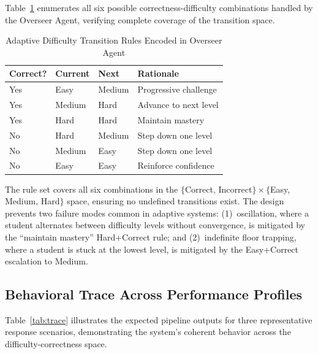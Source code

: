 \documentclass[conference]{IEEEtran}
\begin{document}
Table~\ref{tab:adaptive_rules} enumerates all six possible correctness-difficulty combinations handled by the Overseer Agent, verifying complete coverage of the transition space.

\begin{table}[htbp]
\caption{Adaptive Difficulty Transition Rules Encoded in Overseer Agent}
\label{tab:adaptive_rules}
\centering
\renewcommand{\arraystretch}{1.2}
\begin{tabular}{|>{\centering\arraybackslash}m{1.4cm}|
                 >{\centering\arraybackslash}m{1.4cm}|
                 >{\centering\arraybackslash}m{1.5cm}|
                 >{\raggedright\arraybackslash}m{2.3cm}|}
\hline
\textbf{Correct?} & \textbf{Current} & \textbf{Next} & \textbf{Rationale} \\
\hline
Yes & Easy   & Medium & Progressive challenge \\
\hline
Yes & Medium & Hard   & Advance to next level \\
\hline
Yes & Hard   & Hard   & Maintain mastery \\
\hline
No  & Hard   & Medium & Step down one level \\
\hline
No  & Medium & Easy   & Step down one level \\
\hline
No  & Easy   & Easy   & Reinforce confidence \\
\hline
\end{tabular}
\end{table}

The rule set covers all six combinations in the $\{$Correct, Incorrect$\} \times \{$Easy, Medium, Hard$\}$ space, ensuring no undefined transitions exist. The design prevents two failure modes common in adaptive systems: (1)~oscillation, where a student alternates between difficulty levels without convergence, is mitigated by the ``maintain mastery'' Hard+Correct rule; and (2)~indefinite floor trapping, where a student is stuck at the lowest level, is mitigated by the Easy+Correct escalation to Medium.

\subsection{Behavioral Trace Across Performance Profiles}

Table~\ref{tab:trace} illustrates the expected pipeline outputs for three representative response scenarios, demonstrating the system's coherent behavior across the difficulty-correctness space.
\end{document}
